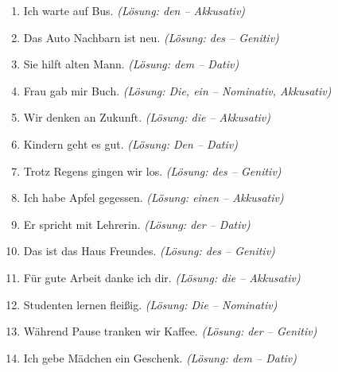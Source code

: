 \begin{enumerate}[label=\textbf{Aufgabe \arabic*}.]
    \item Ich warte auf \underline{\hspace{1.5cm}} Bus. \quad \textit{(Lösung: den -- Akkusativ)}
    \item Das Auto \underline{\hspace{1.5cm}} Nachbarn ist neu. \quad \textit{(Lösung: des -- Genitiv)}
    \item Sie hilft \underline{\hspace{1.5cm}} alten Mann. \quad \textit{(Lösung: dem -- Dativ)}
    \item \underline{\hspace{1.5cm}} Frau gab mir \underline{\hspace{1.5cm}} Buch. \quad \textit{(Lösung: Die, ein -- Nominativ, Akkusativ)}
    \item Wir denken an \underline{\hspace{1.5cm}} Zukunft. \quad \textit{(Lösung: die -- Akkusativ)}
    \item \underline{\hspace{1.5cm}} Kindern geht es gut. \quad \textit{(Lösung: Den -- Dativ)}
    \item Trotz \underline{\hspace{1.5cm}} Regens gingen wir los. \quad \textit{(Lösung: des -- Genitiv)}
    \item Ich habe \underline{\hspace{1.5cm}} Apfel gegessen. \quad \textit{(Lösung: einen -- Akkusativ)}
    \item Er spricht mit \underline{\hspace{1.5cm}} Lehrerin. \quad \textit{(Lösung: der -- Dativ)}
    \item Das ist das Haus \underline{\hspace{1.5cm}} Freundes. \quad \textit{(Lösung: des -- Genitiv)}
    \item Für \underline{\hspace{1.5cm}} gute Arbeit danke ich dir. \quad \textit{(Lösung: die -- Akkusativ)}
    \item \underline{\hspace{1.5cm}} Studenten lernen fleißig. \quad \textit{(Lösung: Die -- Nominativ)}
    \item Während \underline{\hspace{1.5cm}} Pause tranken wir Kaffee. \quad \textit{(Lösung: der -- Genitiv)}
    \item Ich gebe \underline{\hspace{1.5cm}} Mädchen ein Geschenk. \quad \textit{(Lösung: dem -- Dativ)}

\end{enumerate}
